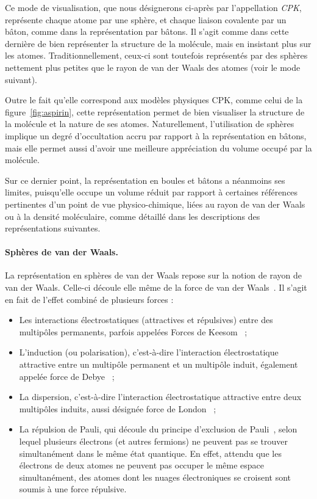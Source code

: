 	Ce mode de visualisation, que nous désignerons ci-après par l'appellation \emph{CPK}, représente chaque atome par une sphère, et chaque liaison covalente par un bâton, comme dans la représentation par bâtons. Il s'agit comme dans cette dernière de bien représenter la structure de la molécule, mais en insistant plus sur les atomes. Traditionnellement, ceux-ci sont toutefois représentés par des sphères nettement plus petites que le rayon de van der Waals des atomes (voir le mode suivant).
		
	Outre le fait qu'elle correspond aux modèles physiques CPK, comme celui de la figure~\ref{fig:aspirin}, cette représentation permet de bien visualiser la structure de la molécule et la nature de ses atomes. Naturellement, l'utilisation de sphères implique un degré d'occultation accru par rapport à la représentation en bâtons, mais elle permet aussi d'avoir une meilleure appréciation du volume occupé par la molécule.
		
	Sur ce dernier point, la représentation en boules et bâtons a néanmoins ses limites, puisqu'elle occupe un volume réduit par rapport à certaines références pertinentes d'un point de vue physico-chimique, liées au rayon de van der Waals ou à la densité moléculaire, comme détaillé dans les descriptions des représentations suivantes.
		
	\paragraph{Sphères de van der Waals.} La représentation en sphères de van der Waals repose sur la notion de rayon de van der Waals. Celle-ci découle elle même de la force de van der Waals~\cite{dzyaloshinskii1961general}. Il s'agit en fait de l'effet combiné de plusieurs forces :
	
	\begin{itemize}
	    \item Les interactions électrostatiques (attractives et répulsives) entre des multipôles permanents, parfois appelées Forces de Keesom~\cite{keesom1915second} ;
		\item L'induction (ou polarisation), c'est-à-dire l'interaction électrostatique attractive entre un multipôle permanent et un multipôle induit, également appelée force de Debye~\cite{debye1913reprinted, debye1929polar} ;
	    \item La dispersion, c'est-à-dire l'interaction électrostatique attractive entre deux multipôles induits, aussi désignée force de London~\cite{eisenschitz1930verhaltnis, london1930theorie, london1937general} ;
		\item La répulsion de Pauli, qui découle du principe d'exclusion de Pauli~\cite{pauli1925zusammenhang}, selon lequel plusieurs électrons (et autres fermions) ne peuvent pas se trouver simultanément dans le même état quantique. En effet, attendu que les électrons de deux atomes ne peuvent pas occuper le même espace simultanément, des atomes dont les nuages électroniques se croisent sont soumis à une force répulsive.
	\end{itemize}

